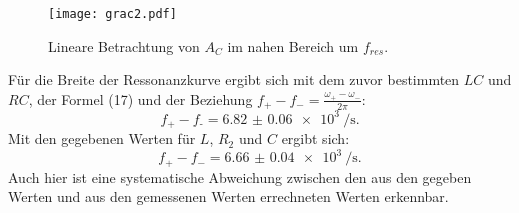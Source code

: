 \begin{figure}[H]
	\centering
	\caption{Lineare Betrachtung von $A_C$ im nahen Bereich um $f_{res}$.}
	\texttt{[image: grac2.pdf]}
	\label{fig:grac2}
\end{figure}

Für die Breite der Ressonanzkurve ergibt sich mit dem zuvor bestimmten $LC$ und $RC$, der Formel (17) und der Beziehung $f_+ - f_- = \frac{\omega_+ - \omega_-}{2\pi}$:
\begin{displaymath}
f_\text{+} - f_\text{-} = \SI{6.82(6)e3}{\per\second}\text{.}
\end{displaymath}
Mit den gegebenen Werten für $L$, $R_2$ und $C$ ergibt sich:
\begin{displaymath}
f_+ - f_- = \SI{6.66(4)e3}{\per\second}\text{.}
\end{displaymath}
Auch hier ist eine systematische Abweichung zwischen den aus den gegeben Werten und aus den gemessenen Werten errechneten Werten erkennbar.



